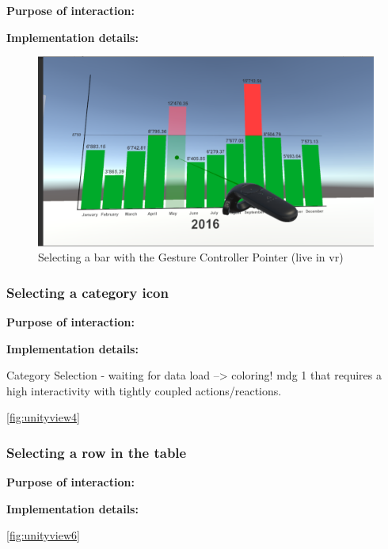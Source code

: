 \textbf{Purpose of interaction:}

\textbf{Implementation details:}

\begin{figure}[h]
	\begin{center}
		\includegraphics[width=12cm]{03_Figures/08_Development/Bar_Selection.png}
		\caption{Selecting a bar with the Gesture Controller Pointer (live in \gls{vr})}
		\label{fig:unitybarselection}
	\end{center}
\end{figure}


\subsubsection{Selecting a category icon}

\textbf{Purpose of interaction:}

\textbf{Implementation details:}


Category Selection - waiting for data load --> coloring!
\gls{mdg} 1 that requires a high interactivity with tightly coupled actions/reactions.

\ref{fig:unityview4}



\subsubsection{Selecting a row in the table}

\textbf{Purpose of interaction:}

\textbf{Implementation details:}

\ref{fig:unityview6}




